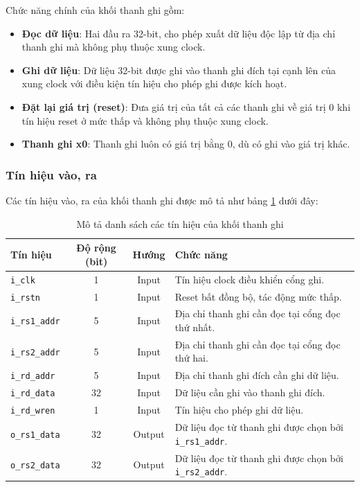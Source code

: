 Chức năng chính của khối thanh ghi gồm:
\begin{itemize}
    \item \textbf{Đọc dữ liệu}: Hai đầu ra 32-bit, cho phép xuất dữ liệu độc lập từ địa chỉ thanh ghi mà không phụ thuộc xung clock.
    \item \textbf{Ghi dữ liệu}: Dữ liệu 32-bit được ghi vào thanh ghi đích tại cạnh lên của xung clock với điều kiện tín hiệu cho phép ghi được kích hoạt.
    \item \textbf{Đặt lại giá trị (reset)}: Đưa giá trị của tất cả các thanh ghi về giá trị 0 khi tín hiệu reset ở mức thấp và không phụ thuộc xung clock.
    \item \textbf{Thanh ghi x0}: Thanh ghi luôn có giá trị bằng 0, dù có ghi vào giá trị khác.
\end{itemize}

\subsubsection{Tín hiệu vào, ra}
\label{subsubsec:m1-reg_file_in_out}
Các tín hiệu vào, ra của khối thanh ghi được mô tả như bảng \ref{tab:register_file_signals} dưới đây:
\begin{table}[H]
  \centering
  \caption{Mô tả danh sách các tín hiệu của khối thanh ghi}
  \label{tab:register_file_signals}
  \begin{tabularx}{\textwidth}{l c c X}
    \toprule
    \textbf{Tín hiệu} & \textbf{Độ rộng (bit)} & \textbf{Hướng} & \textbf{Chức năng} \\
    \midrule
    \texttt{i\_clk}       & 1  & Input  & Tín hiệu clock điều khiển cổng ghi. \\[3pt]
    \texttt{i\_rstn}      & 1  & Input  & Reset bất đồng bộ, tác động mức thấp. \\[3pt]
    \texttt{i\_rs1\_addr} & 5  & Input  & Địa chỉ thanh ghi cần đọc tại cổng đọc thứ nhất. \\[3pt]
    \texttt{i\_rs2\_addr} & 5  & Input  & Địa chỉ thanh ghi cần đọc tại cổng đọc thứ hai. \\[3pt]
    \texttt{i\_rd\_addr}  & 5  & Input  & Địa chỉ thanh ghi đích cần ghi dữ liệu. \\[3pt]
    \texttt{i\_rd\_data}  & 32 & Input  & Dữ liệu cần ghi vào thanh ghi đích. \\[3pt]
    \texttt{i\_rd\_wren}  & 1  & Input  & Tín hiệu cho phép ghi dữ liệu. \\[3pt]
    \texttt{o\_rs1\_data} & 32 & Output & Dữ liệu đọc từ thanh ghi được chọn bởi \texttt{i\_rs1\_addr}. \\[3pt]
    \texttt{o\_rs2\_data} & 32 & Output & Dữ liệu đọc từ thanh ghi được chọn bởi \texttt{i\_rs2\_addr}. \\
    \bottomrule
  \end{tabularx}
\end{table}


